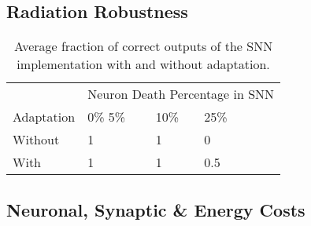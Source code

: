 \subsection*{Radiation Robustness}\label{subsec:algorithm_performance}
\vspace{-3em}
\begin{table}[H]
\caption{Average fraction of correct outputs of the SNN implementation with and without adaptation. }%
\begin{tabular}{llllll}
        & \multicolumn{5}{l}{Neuron Death Percentage in SNN} \\ \cmidrule{2-6}
        Adaptation & 0\%   5\% & 10\%    & 25\%     \\ \hline
        Without      & 1 &  1    & 0                 \\
        With      & 1 & 1    & 0.5                   \\    
\end{tabular}
\end{table}


\subsection*{Neuronal, Synaptic \& Energy Costs}\label{subsec:results_neuronal_synaptic_overcapacity}

